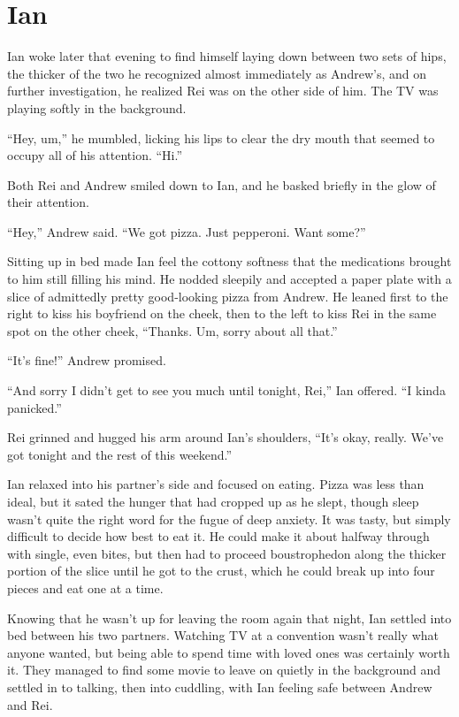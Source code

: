\chapter{Ian}

Ian woke later that evening to find himself laying down between two sets of hips, the thicker of the two he recognized almost immediately as Andrew's, and on further investigation, he realized Rei was on the other side of him. The TV was playing softly in the background.

``Hey, um,'' he mumbled, licking his lips to clear the dry mouth that seemed to occupy all of his attention. ``Hi.''

Both Rei and Andrew smiled down to Ian, and he basked briefly in the glow of their attention.

``Hey,'' Andrew said. ``We got pizza. Just pepperoni. Want some?''

Sitting up in bed made Ian feel the cottony softness that the medications brought to him still filling his mind. He nodded sleepily and accepted a paper plate with a slice of admittedly pretty good-looking pizza from Andrew. He leaned first to the right to kiss his boyfriend on the cheek, then to the left to kiss Rei in the same spot on the other cheek, ``Thanks. Um, sorry about all that.''

``It's fine!'' Andrew promised.

``And sorry I didn't get to see you much until tonight, Rei,'' Ian offered. ``I kinda panicked.''

Rei grinned and hugged his arm around Ian's shoulders, ``It's okay, really. We've got tonight and the rest of this weekend.''

Ian relaxed into his partner's side and focused on eating. Pizza was less than ideal, but it sated the hunger that had cropped up as he slept, though sleep wasn't quite the right word for the fugue of deep anxiety.  It was tasty, but simply difficult to decide how best to eat it. He could make it about halfway through with single, even bites, but then had to proceed boustrophedon along the thicker portion of the slice until he got to the crust, which he could break up into four pieces and eat one at a time.

Knowing that he wasn't up for leaving the room again that night, Ian settled into bed between his two partners. Watching TV at a convention wasn't really what anyone wanted, but being able to spend time with loved ones was certainly worth it. They managed to find some movie to leave on quietly in the background and settled in to talking, then into cuddling, with Ian feeling safe between Andrew and Rei.

